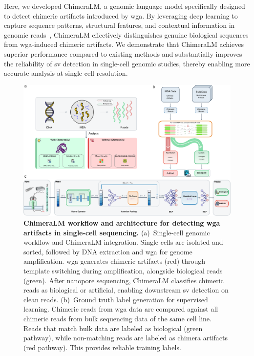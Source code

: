 \documentclass[pdflatex,sn-nature,lineno]{sn-jnl}%
\theoremstyle{thmstyleone}%
\theoremstyle{thmstyletwo}%
\theoremstyle{thmstylethree}%
\begin{document}
Here, we developed ChimeraLM, a genomic language model specifically designed to detect chimeric artifacts introduced by \gls{wga}.
By leveraging deep learning to capture sequence patterns, structural features, and contextual information in genomic reads~\cite{dalla2025nucleotide,zhou2023dnabert,nguyen2023hyenadna,consens2023transformers}, ChimeraLM effectively distinguishes genuine biological sequences from \gls{wga}-induced chimeric artifacts.
We demonstrate that ChimeraLM achieves superior performance compared to existing methods and substantially improves the reliability of \gls{sv} detection in single-cell genomic studies, thereby enabling more accurate analysis at single-cell resolution.

\begin{figure}[p]
	\begin{center}
		\includegraphics[width=\textwidth]{final_figures/figure1}
	\end{center}
	\caption{{\bf ChimeraLM workflow and architecture for detecting \gls{wga} artifacts in single-cell sequencing.}
		(a)~Single-cell genomic workflow and ChimeraLM integration. Single cells are isolated and sorted, followed by DNA extraction and \gls{wga} for genome amplification. \gls{wga} generates chimeric artifacts (red) through template switching during amplification, alongside biological reads (green). After nanopore sequencing, ChimeraLM classifies chimeric reads as biological or artificial, enabling downstream \gls{sv} detection on clean reads.
		(b)~Ground truth label generation for supervised learning. Chimeric reads from \gls{wga} data are compared against all chimeric reads from bulk sequencing data of the same cell line. Reads that match bulk data are labeled as biological (green pathway), while non-matching reads are labeled as chimera artifacts (red pathway). This provides reliable training labels.
}
\end{figure}
\end{document}
